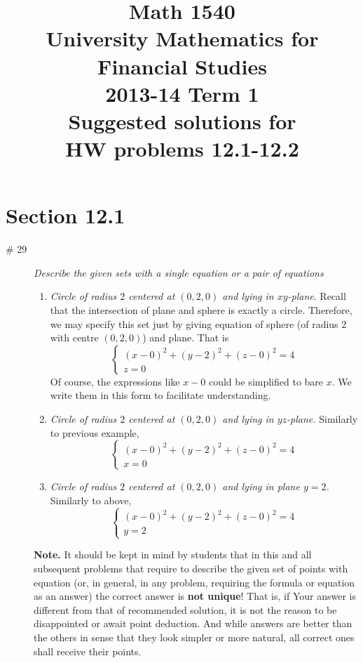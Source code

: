 \documentclass[8pt]{article} %
\title{Math 1540\\University Mathematics for Financial Studies\\2013-14 Term 1\\Suggested solutions for\\HW problems 12.1-12.2}
\begin{document}
\maketitle
\section{Section 12.1}
\begin{description}
\item[\# 29]{{\it Describe the given sets with a single equation or a pair of equations}
\begin{enumerate}[label=\bfseries\alph*.]
\item{{\it Circle of radius $2$ centered at $(0,2,0)$ and lying in $xy$-plane}. Recall that the intersection of plane and sphere is exactly a circle.
Therefore, we may specify this set just by giving equation of sphere (of radius 2 with centre $(0,2,0)$) and plane. That is
\[
\begin{cases}
(x-0)^2+(y-2)^2+(z-0)^2=4\\z=0
\end{cases}
\]
Of course, the expressions like $x-0$ could be simplified to bare $x$. We write them in this form to facilitate understanding.
}
\item{{\it Circle of radius $2$ centered at $(0,2,0)$ and lying in $yz$-plane.} Similarly to previous example,
\[
\begin{cases}
(x-0)^2+(y-2)^2+(z-0)^2=4\\x=0
\end{cases}
\]}
\item{{\it Circle of radius $2$ centered at $(0,2,0)$ and lying in plane $y=2$.} Similarly to above,
\[
\begin{cases}
(x-0)^2+(y-2)^2+(z-0)^2=4\\y=2
\end{cases}
\]}
\end{enumerate}
\textbf{Note. } It should be kept in mind by students that in this and all subsequent problems that require to describe the given set
of points with equation (or, in general, in any problem, requiring the formula or equation as an answer) the correct answer is \textbf{not unique}! That is, if Your answer is different from that of recommended solution, it is
not the reason to be disappointed or await point deduction. And while answers are better than the others in sense that they
look simpler or more natural, all correct ones shall receive their points.

}
\end{description}
\end{document}

